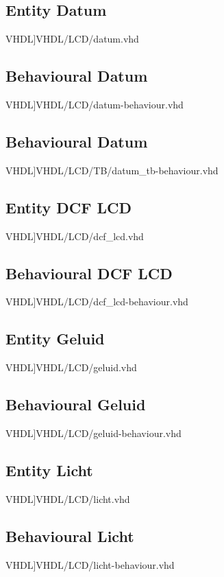 \subsection{Entity Datum}
\scriptsize 
 VHDL]{VHDL/LCD/datum.vhd}
\normalsize
\label{code:ent_datum}

\subsection{Behavioural Datum}
\scriptsize 
 VHDL]{VHDL/LCD/datum-behaviour.vhd}
\normalsize
\label{code:beh_datum}

\subsection{Behavioural Datum}
\scriptsize 
 VHDL]{VHDL/LCD/TB/datum_tb-behaviour.vhd}
\normalsize
\label{code:datum_tb}


\subsection{Entity DCF LCD}
\scriptsize 
 VHDL]{VHDL/LCD/dcf_lcd.vhd}
\normalsize
\label{code:ent_dcf-lcd}
\subsection{Behavioural DCF LCD}
\scriptsize 
 VHDL]{VHDL/LCD/dcf_lcd-behaviour.vhd}
\normalsize
\label{code:beh_dcf-lcd}
\subsection{Entity Geluid}
\scriptsize 
 VHDL]{VHDL/LCD/geluid.vhd}
\normalsize
\label{code:ent_geluid}
\subsection{Behavioural Geluid}
\scriptsize 
 VHDL]{VHDL/LCD/geluid-behaviour.vhd}
\normalsize
\label{code:beh_geluid}
\subsection{Entity Licht}
\scriptsize 
 VHDL]{VHDL/LCD/licht.vhd}
\normalsize
\label{code:ent_licht}
\subsection{Behavioural Licht}
\scriptsize 
 VHDL]{VHDL/LCD/licht-behaviour.vhd}
\normalsize
\label{code:beh_licht}
